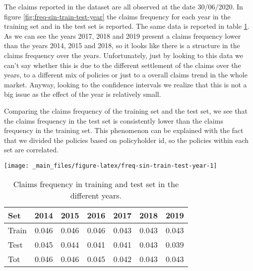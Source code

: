 \documentclass[a4paper, twoside, openright, 12pt]{report}
\let\origfigure\figure
\let\endorigfigure\endfigure
\renewenvironment{figure}[1][2] {
  \expandafter\origfigure\expandafter[!hbtp]
} {
  \endorigfigure
}
\theoremstyle{definition}
\theoremstyle{definition}
\theoremstyle{definition}
\theoremstyle{remark}
\begin{document}
The claims reported in the dataset are all observed at the date 30/06/2020. In figure \ref{fig:freq-sin-train-test-year} the claims frequency for each year in the training set and in the test set is reported. The same data is reported in table \ref{tab:freq-sin-train-test-year}. As we can see the years 2017, 2018 and 2019 present a claims frequency lower than the years 2014, 2015 and 2018, so it looks like there is a structure in the claims frequency over the years. Unfortunately, just by looking to this data we can't say whether this is due to the different settlement of the claims over the years, to a different mix of policies or just to a overall claims trend in the whole market. Anyway, looking to the confidence intervals we realize that this is not a big issue as the effect of the year is relatively small.

Comparing the claims frequency of the training set and the test set, we see that the claims frequency in the test set is consistently lower than the claims frequency in the training set. This phenomenon can be explained with the fact that we divided the policies based on policyholder id, so the policies within each set are correlated.





\begin{figure}[!hbtp]

{\centering \texttt{[image: \_main\_files/figure-latex/freq-sin-train-test-year-1]} 

}

\caption[Claims frequency in training and test set in the different years.]{Claims frequency in training and test set in the different years. The semi-transparent ribbons represent 95\% confidence intervals for the claims frequency in each year.}\label{fig:freq-sin-train-test-year}
\end{figure}

\begin{table}[!h]

\caption{\label{tab:freq-sin-train-test-year}Claims frequency in training and test set in the different years.}
\centering
\begin{tabular}[t]{lcccccc}
\toprule
\textbf{Set} & \textbf{2014} & \textbf{2015} & \textbf{2016} & \textbf{2017} & \textbf{2018} & \textbf{2019}\\
\midrule[\heavyrulewidth]
Train & 0.046 & 0.046 & 0.046 & 0.043 & 0.043 & 0.043\\
Test & 0.045 & 0.044 & 0.041 & 0.041 & 0.043 & 0.039\\
\midrule
Tot & 0.046 & 0.046 & 0.045 & 0.042 & 0.043 & 0.043\\
\bottomrule
\end{tabular}
\end{table}
\end{document}

